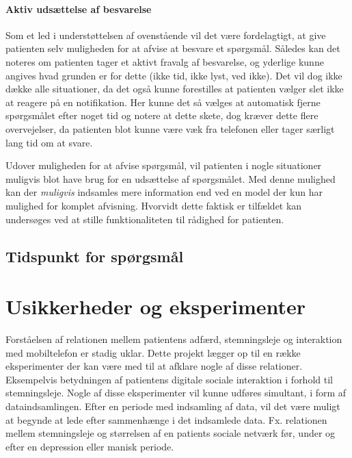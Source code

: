 \paragraph{Aktiv udsættelse af besvarelse}
Som et led i understøttelsen af ovenstående vil det være fordelagtigt, at give patienten selv muligheden for at afvise at besvare et spørgsmål.
Således kan det noteres om patienten tager et aktivt fravalg af besvarelse, og yderlige kunne angives hvad grunden er for dette (ikke tid, ikke lyst, ved ikke).
Det vil dog ikke dække alle situationer, da det også kunne forestilles at patienten vælger slet ikke at reagere på en notifikation.
Her kunne det så vælges at automatisk fjerne spørgsmålet efter noget tid og notere at dette skete, dog kræver dette flere overvejelser, da patienten blot kunne være væk fra telefonen eller tager særligt lang tid om at svare.

Udover muligheden for at afvise spørgsmål, vil patienten i nogle situationer muligvis blot have brug for en udsættelse af spørgsmålet.
Med denne mulighed kan der \textit{muligvis} indsamles mere information end ved en model der kun har mulighed for komplet afvisning.
Hvorvidt dette faktisk er tilfældet kan undersøges ved at stille funktionaliteten til rådighed for patienten.

\subsection{Tidspunkt for spørgsmål}


\section{Usikkerheder og eksperimenter}
Forståelsen af relationen mellem patientens adfærd, stemningsleje og interaktion med mobiltelefon er stadig uklar.
Dette projekt lægger op til en række eksperimenter der kan være med til at afklare nogle af disse relationer.
Eksempelvis betydningen af patientens digitale sociale interaktion i forhold til stemningsleje.
Nogle af disse eksperimenter vil kunne udføres simultant, i form af dataindsamlingen.
Efter en periode med indsamling af data, vil det være muligt at begynde at lede efter sammenhænge i det indsamlede data.
Fx. relationen mellem stemningsleje og størrelsen af en patients sociale netværk før, under og efter en depression eller manisk periode.

